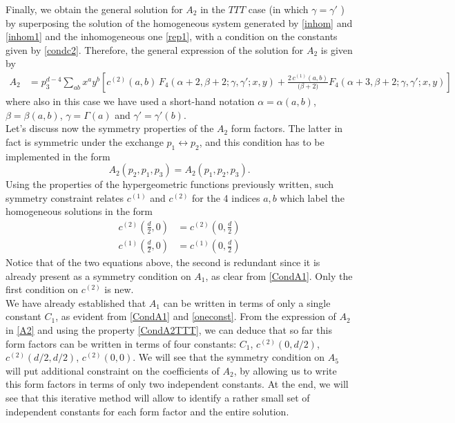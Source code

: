 \documentclass[a4paper,11pt,openright,twoside]{book}
\let\a=\alpha   \let\b=\beta   \let\g=\gamma   \let\d=\delta
\numberwithin{equation}{section}
\begin{document}
{{Finally, we obtain the general solution for $A_2$ in the $TTT$ case (in which $\g=\g'$ ) by superposing the solution of the homogeneous 
system generated by \eqref{inhom} and \eqref{inhom1} and the inhomogeneous one \eqref{rep1}, with a condition on the constants given by \eqref{condc2}. Therefore, the general expression of the solution for $A_2$ is given by
\begin{align}
A_2&= p_3^{d - 4}\sum_{a b} x^a y^b\left[c^{(2)}(a,b)\,F_4(\alpha +2, \beta+2; \gamma, \gamma'; x, y)+ \frac{2\,c^{(1)}(a,b)}{\big(\b+2\big)}F_4(\alpha +3, \beta+2; \gamma, \gamma'; x, y)\right]\label{A2}
\end{align}
where also in this case we have used a short-hand notation $\a=\a(a,b)$, $\b=\b(a,b)$, $\g=\Gamma(a)$ and $\g'=\g'(b)$. \\
Let's discuss now the symmetry properties of the $A_2$ form factors. The latter in fact is symmetric under the exchange $p_1\leftrightarrow p_2$, and this condition has to be implemented in the form
\begin{equation}
A_2(p_2,p_1,p_3)=A_2(p_1,p_2,p_3).
\end{equation}
Using the properties of the hypergeometric functions previously written, such symmetry constraint relates  $c^{(1)}$ and $c^{(2)}$ for the 4 indices $a,b$ which label the homogeneous solutions in the form  
\begin{equation}
\label{CondA2TTT}
\begin{split}
	c^{(2)}\left(\frac{d}{2},0\right)&=c^{(2)}\left(0,\frac{d}{2}\right)\\
	c^{(1)}\left(\frac{d}{2},0\right)&=c^{(1)}\left(0,\frac{d}{2}\right)
\end{split}
\end{equation}
Notice that of the two equations above, the second is redundant since it is already present as a symmetry condition on $A_1$, as clear from \eqref{CondA1}. Only the first condition on $c^{(2)}$ is new. \\
We have already established that $A_1$ can be written in terms of only a single constant $C_1$, as evident from \eqref{CondA1} and \eqref{oneconst}. From the expression of $A_2$ in \eqref{A2} and using the property \eqref{CondA2TTT}, we can deduce that so far this form factors can be written in terms of four constants: $C_1$, $c^{(2)}\left(0,d/2\right)$, $c^{(2)}\left(d/2,d/2\right)$, $c^{(2)}\left(0,0\right)$. We will see that the symmetry condition on $A_5$ will put additional constraint on the coefficients of $A_2$, by allowing us to write this form factors in terms of only two independent constants. At the end, we will see that this iterative method will allow to identify a rather small set of independent  constants for each form factor and the entire solution.

}}
\end{document}
